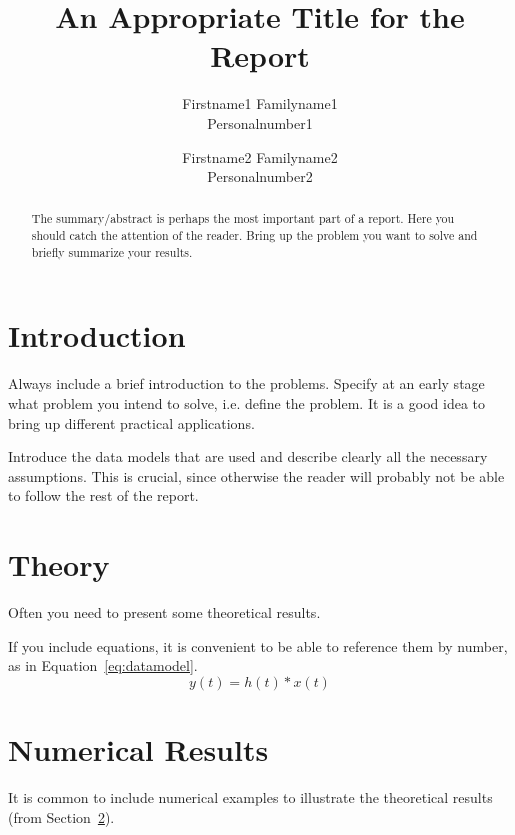 \documentclass[a4paper,twocolumn]{article}
\begin{document}
\title{An Appropriate Title for the Report}
\author{Firstname1 Familyname1 \\ Personalnumber1 \and Firstname2 Familyname2\\
  Personalnumber2}

\maketitle


\begin{abstract}
  The summary/abstract is perhaps the most important part of a
  report. Here you should catch the attention of the reader. Bring up
  the problem you want to solve and briefly summarize your results.
\end{abstract}

\section{Introduction}
\label{sec:intro}

Always include a brief introduction to the problems. Specify at an
early stage what problem you intend to solve, i.e. define the
problem. It is a good idea to bring up different practical
applications.

Introduce the data models that are used and describe clearly all the
necessary assumptions. This is crucial, since otherwise the reader
will probably not be able to follow the rest of the report.

\section{Theory}
\label{sec:theory}

Often you need to present some theoretical results.

If you include equations, it is convenient to be able to reference
them by number, as in Equation~\eqref{eq:datamodel}.
\begin{equation}
  \label{eq:datamodel}
  y(t) = h(t) \ast x(t)
\end{equation}

\section{Numerical Results}
\label{sec:numerical}

It is common to include numerical examples to illustrate the
theoretical results (from Section~\ref{sec:theory}).
\end{document}

